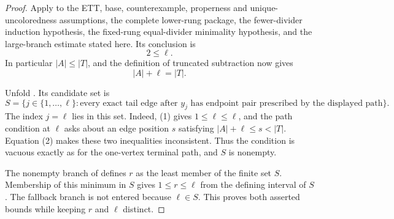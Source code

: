 \begin{proof}
Apply  to the ETT, base,
counterexample, properness and unique-uncoloredness assumptions, the
complete lower-rung package, the fewer-divider induction hypothesis, the
fixed-rung equal-divider minimality hypothesis, and the large-branch
estimate stated here.  Its conclusion is
\[
                              2\leq\ell.                       \tag{1}
\]
In particular $|A|\leq |T|$, and the definition of truncated subtraction
now gives
\[
                         |A|+\ell=|T|.                         \tag{2}
\]

Unfold .  Its candidate set is
\[
 S=\{j\in\{1,\ldots,\ell\}:\text{every exact tail edge after }y_j
       \text{ has endpoint pair prescribed by the displayed path}\}.
\]
The index $j=\ell$ lies in this set.  Indeed, (1) gives
$1\leq\ell\leq\ell$, and the path condition at $\ell$ asks about an edge
position $s$ satisfying $|A|+\ell\leq s<|T|$.  Equation (2) makes these
two inequalities inconsistent.  Thus the condition is vacuous exactly
as for the one-vertex terminal path, and $S$ is nonempty.

The nonempty branch of  defines $r$ as the
least member of the finite set $S$.  Membership of this minimum in $S$
gives $1\leq r\leq\ell$ from the defining interval of $S$.  The fallback
branch is not entered because $\ell\in S$.  This proves both asserted
bounds while keeping $r$ and $\ell$ distinct.
\end{proof}
